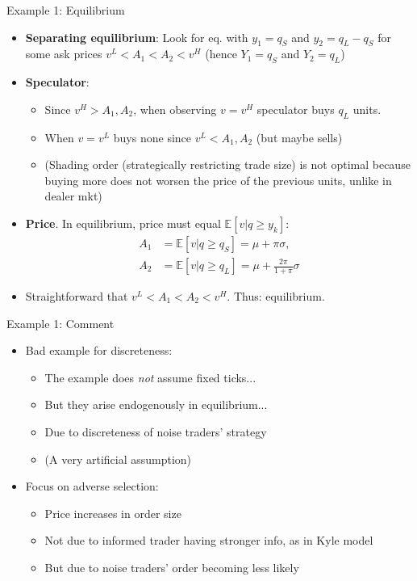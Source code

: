 \documentclass[english,10pt
,aspectratio=169
]{beamer}
\begin{document}
\begin{frame}{Example 1: Equilibrium}
	\begin{itemize}
		\item \textbf{Separating equilibrium}: Look for eq. with $y_{1}=q_{S}$ and $y_{2}=q_{L}-q_{S}$ for some ask prices $v^L<A_1<A_2<v^H$ (hence $Y_1=q_S$ and $Y_2=q_L$)
		\pause
		\item \textbf{Speculator}: 
		\begin{itemize}
			\item Since $v^H > A_1,A_2$, when observing $v=v^{H}$ speculator buys $q_{L}$ units. 
			\item When $v=v^L$ buys none since $v^L < A_1,A_2$ (but maybe sells)
			\item (Shading order (strategically restricting trade size) is not optimal because buying more does not worsen the price of the previous units, unlike in dealer mkt)
		\end{itemize}
		\item \textbf{Price}. In equilibrium, price must equal $\mathbb{E}[v|q\geq y_k]$:
		\begin{align*}
			A_1 & =\mathbb{E}[v|q \geq q_{S}] = \mu + \pi \sigma,
			\\
			A_2 & = \mathbb{E}[v|q \geq q_{L}] = \mu + \frac{2\pi}{1+\pi} \sigma
		\end{align*}
		\item Straightforward that $v^L<A_1<A_2<v^H$. Thus: equilibrium.
	\end{itemize}
\end{frame}


\begin{frame}{Example 1: Comment}
	\begin{itemize}
		\item Bad example for discreteness:
		\begin{itemize}
			\item The example does \emph{not} assume fixed ticks...
			\item But they arise endogenously in equilibrium...
			\item Due to discreteness of noise traders' strategy
			\item (A very artificial assumption)
		\end{itemize}
		\pause
		\item Focus on adverse selection:
		\begin{itemize}
			\item Price increases in order size
			\item Not due to informed trader having stronger info, as in Kyle model
			\item But due to noise traders' order becoming less likely
		\end{itemize}
	\end{itemize}
\end{frame}
\end{document}
